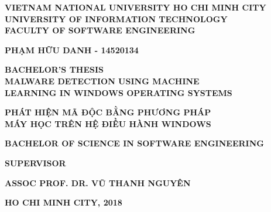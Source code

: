 \begin{titlepage}

\thisfancypage{
    \setlength{\fboxsep}{15pt}
    \doublebox
}{}

\begin{center}
  
\textbf{\large VIETNAM NATIONAL UNIVERSITY HO CHI MINH CITY} \\[2mm]
\textbf{\Large UNIVERSITY OF INFORMATION TECHNOLOGY} \\ [2mm]
\textbf{\Large FACULTY OF SOFTWARE ENGINEERING}

\vspace{0.07\textheight}
\begin{otherlanguage}{vietnamese}
\textbf{\large PHẠM HỮU DANH - 14520134}
\end{otherlanguage}

\vspace{0.1\textheight}
\textbf{\Large BACHELOR’S THESIS} \\ [10mm]

\textbf{\Large MALWARE DETECTION USING MACHINE } \\ [2mm]
\textbf{\Large LEARNING IN WINDOWS OPERATING SYSTEMS} \\ [10mm]
\begin{otherlanguage}{vietnamese}
\textbf{ \Large PHÁT HIỆN MÃ ĐỘC BẰNG PHƯƠNG PHÁP} \\ [2mm]
\textbf{ \Large MÁY HỌC TRÊN HỆ ĐIỀU HÀNH WINDOWS}
\end{otherlanguage}

\vspace{0.1\textheight}
\textbf{\large BACHELOR OF SCIENCE IN SOFTWARE ENGINEERING} 

\vspace{0.07\textheight}
\textbf{\large SUPERVISOR} \\ [2mm]
\begin{otherlanguage}{vietnamese}
\textbf{\large ASSOC PROF. DR. VŨ THANH NGUYÊN}
\end{otherlanguage}


\vspace{\fill}
\textbf{\large HO CHI MINH CITY, 2018}

\end{center}
\end{titlepage}
\cleardoublepage
